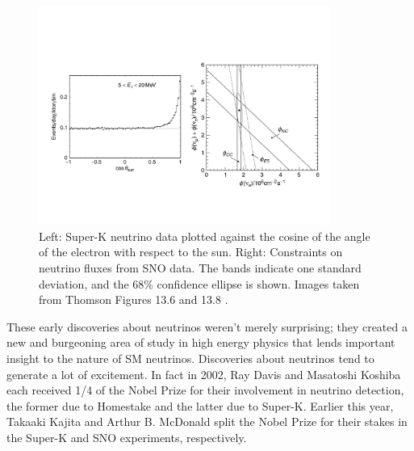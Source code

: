 \begin{figure}
  \centering
  \includegraphics[width=0.85\textwidth,height=0.85\textheight,keepaspectratio]
                {pictures/t13_6&8.pdf}
  \vspace*{-10mm}
  \caption{Left: Super-K neutrino data plotted against the cosine of the
           angle of the electron with respect to the sun. Right: Constraints
           on neutrino fluxes from SNO data. The bands indicate one standard
           deviation, and the 68\% confidence ellipse is shown. Images taken
           from Thomson Figures 13.6 and 13.8 \cite{thomson_modern_2013}.}
\end{figure}

These early discoveries about neutrinos weren't merely surprising; they
created a new and burgeoning area of study in high energy physics
that lends important
insight to the nature of SM neutrinos. Discoveries about neutrinos tend
to generate a lot of excitement.
In fact in 2002, Ray Davis and Masatoshi Koshiba each received 1/4 of
the Nobel Prize for their involvement in neutrino detection, the former
due to Homestake and the latter due to Super-K. Earlier this year,
Takaaki Kajita and Arthur B. McDonald split the Nobel Prize for their
stakes in the Super-K and SNO experiments, respectively.

